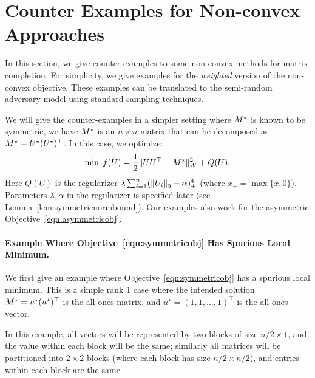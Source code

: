 
\section{Counter Examples for Non-convex Approaches}
\label{app:examples}

In this section, we give counter-examples to some non-convex methods for matrix completion. For simplicity, we give examples for the {\em weighted} version of the non-convex objective. These examples can be translated to the semi-random adversary model using standard sampling techniques.

We will give the counter-examples in a simpler setting where $M^\star$ is known to be symmetric, we have $M^\star$ is an $n\times n$ matrix that can be decomposed as $M^\star = U^\star(U^\star)^\top$. In this case, we optimize:
\begin{equation}
\label{eqn:symmetricobj}
\min \; f(U) = \frac{1}{2}\|UU^\top - M^\star\|_W^2 + Q(U). 
\end{equation}
Here $Q(U)$ is the regularizer $\lambda \sum_{i=1}^n ({\lVert U_i{\rVert}}_2 - \alpha)_+^4$ (where $x_+ = \max\{x,0\}$). Parameters $\lambda, \alpha$ in the regularizer is specified later (see Lemma~\ref{lem:symmetricnormbound}).
%
Our examples also work for the asymmetric Objective~\eqref{eqn:asymmetricobj}.

\paragraph{Example Where Objective~\eqref{eqn:symmetricobj} Has Spurious Local Minimum.}

We first give an example where Objective~\eqref{eqn:symmetricobj} has a spurious local minimum. This is a simple rank 1 case where the intended solution $M^\star = u^\star (u^\star)^\top$ is the all ones matrix, and $u^\star = (1,1,...,1)^\top$ is the all ones vector.

In this example, all vectors will be represented by two blocks of size $n/2 \times 1$, and the value within each block will be the same; similarly all matrices will be partitioned into $2\times 2$ blocks (where each block has size $n/2\times n/2$), and entries within each block are the same.

